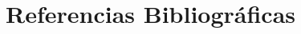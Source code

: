 \section{Referencias Bibliográficas}
\renewcommand{\refname}{} 
\renewcommand{\bibname}{} 
\vspace{-2em}

